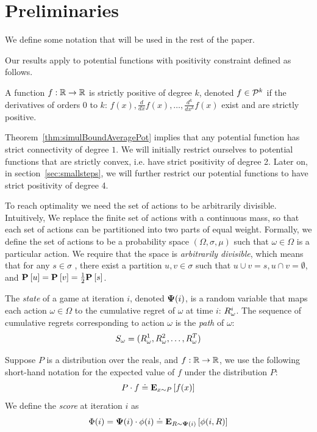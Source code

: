 \documentclass{article}[12pt]
\begin{document}
\section{Preliminaries} \label{sec:preliminaries}

We define some notation that will be used in the rest of the paper.

Our results apply to potential functions with positivity constraint
defined as follows.
\begin{definition}
A function $f:\reals \to \reals$ is strictly positive of degree $k$, 
denoted $f \in \SP{k}$ if the derivatives of orders 0 to $k$:  
$f(x), \frac{d}{dx}f(x), \ldots, \frac{d^k}{dx^k}f(x)$ exist and are strictly positive.
\end{definition}
Theorem~\ref{thm:simulBoundAveragePot} implies that any potential
function has strict connectivity of degree $1$. We will initially restrict
ourselves to potential functions that are strictly convex, i.e. have
strict positivity of degree 2. Later on, in
section~\ref{sec:smallsteps}, we will further restrict our potential
functions to have strict positivity of degree 4.

To reach optimality we need the set of actions to be arbitrarily
divisible. Intuitively, We replace the finite set of actions with a
continuous mass, so that each set of actions can be partitioned into
two parts of equal weight.
Formally, we define the set of actions to be a probability space
$(\Omega,\sigma,\mu)$ such that $\omega \in \Omega$ is a particular
action. We require that the space is {\em arbitrarily divisible},
which means that for any $s \in \sigma$ ,
there exist a partition $u,v \in \sigma$ such that $u \cup v = s, u
\cap v = \emptyset$, and  $\P{}{u}=\P{}{v}=\frac{1}{2} \P{}{s}$.

The {\em state} of a game at iteration $i$, denoted $\state(i)$, is
a random variable that maps each action $\omega \in \Omega$ to the
cumulative regret of $\omega$ at time $i$: $\R_\omega^i$. The sequence
of cumulative regrets corresponding to action $\omega$ is the {\em
  path} of $\omega$:
\begin{equation} \label{eqn:path}
  S_{\omega}=(\R_\omega^1,\R_\omega^2,\ldots,\R_\omega^T)
\end{equation}

Suppose $P$ is a distribution over the reals, and $f:\reals
\to \reals$, we use the following short-hand notation for the expected
value of $f$ under the distribution $P$:
\[ P \cdot f \doteq \E{x \sim P}{f(x)}  \]
We define the {\em score} at iteration $i$ as
\[ \score(i) = \state(i) \cdot \pot(i) \doteq \E{\R \sim \state(i)}{\pot(i,\R)}\]
\end{document}
